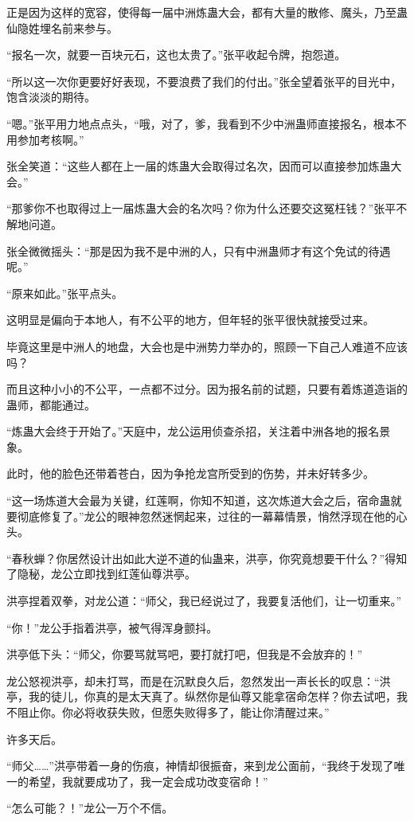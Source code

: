 \begin{this_body}
正是因为这样的宽容，使得每一届中洲炼蛊大会，都有大量的散修、魔头，乃至蛊仙隐姓埋名前来参与。

“报名一次，就要一百块元石，这也太贵了。”张平收起令牌，抱怨道。

“所以这一次你更要好好表现，不要浪费了我们的付出。”张全望着张平的目光中，饱含淡淡的期待。

“嗯。”张平用力地点点头，“哦，对了，爹，我看到不少中洲蛊师直接报名，根本不用参加考核啊。”

张全笑道：“这些人都在上一届的炼蛊大会取得过名次，因而可以直接参加炼蛊大会。”

“那爹你不也取得过上一届炼蛊大会的名次吗？你为什么还要交这冤枉钱？”张平不解地问道。

张全微微摇头：“那是因为我不是中洲的人，只有中洲蛊师才有这个免试的待遇呢。”

“原来如此。”张平点头。

这明显是偏向于本地人，有不公平的地方，但年轻的张平很快就接受过来。

毕竟这里是中洲人的地盘，大会也是中洲势力举办的，照顾一下自己人难道不应该吗？

而且这种小小的不公平，一点都不过分。因为报名前的试题，只要有着炼道造诣的蛊师，都能通过。

“炼蛊大会终于开始了。”天庭中，龙公运用侦查杀招，关注着中洲各地的报名景象。

此时，他的脸色还带着苍白，因为争抢龙宫所受到的伤势，并未好转多少。

“这一场炼道大会最为关键，红莲啊，你知不知道，这次炼道大会之后，宿命蛊就要彻底修复了。”龙公的眼神忽然迷惘起来，过往的一幕幕情景，悄然浮现在他的心头。

“春秋蝉？你居然设计出如此大逆不道的仙蛊来，洪亭，你究竟想要干什么？”得知了隐秘，龙公立即找到红莲仙尊洪亭。

洪亭捏着双拳，对龙公道：“师父，我已经说过了，我要复活他们，让一切重来。”

“你！”龙公手指着洪亭，被气得浑身颤抖。

洪亭低下头：“师父，你要骂就骂吧，要打就打吧，但我是不会放弃的！”

龙公怒视洪亭，却未打骂，而是在沉默良久后，忽然发出一声长长的叹息：“洪亭，我的徒儿，你真的是太天真了。纵然你是仙尊又能拿宿命怎样？你去试吧，我不阻止你。你必将收获失败，但愿失败得多了，能让你清醒过来。”

许多天后。

“师父……”洪亭带着一身的伤痕，神情却很振奋，来到龙公面前，“我终于发现了唯一的希望，我就要成功了，我一定会成功改变宿命！”

“怎么可能？！”龙公一万个不信。


\end{this_body}
